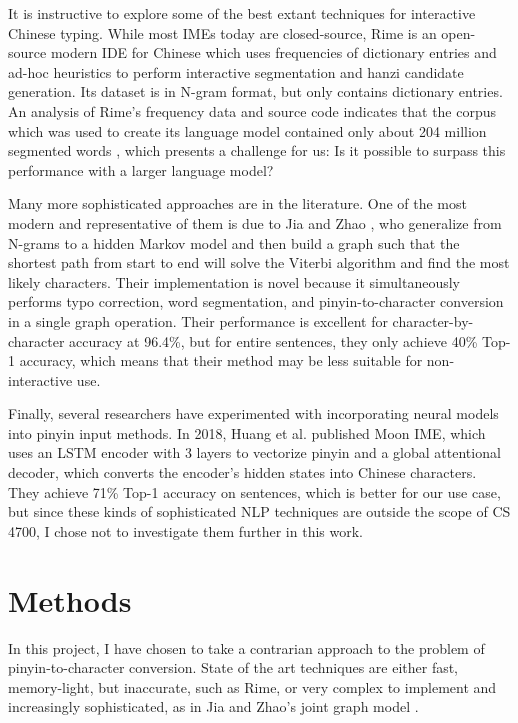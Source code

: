 \documentclass[11pt]{ctexart}
\begin{document}
It is instructive to explore some of the best extant techniques
for interactive Chinese typing.
While most IMEs today are closed-source, 
Rime \cite{rimewebsite} is an open-source modern IDE for Chinese
which uses frequencies of dictionary entries and ad-hoc 
heuristics to perform interactive segmentation and hanzi candidate generation.
Its dataset is in N-gram format, but only contains dictionary entries. An
analysis of Rime's frequency data and source code
indicates that the corpus which was
used to create its language model contained only about 204 million segmented
words \cite{rimegithub}, which presents a challenge for us: Is it possible to surpass
this performance with a larger language model?

Many more sophisticated approaches are in the literature.
One of the most modern and representative of them is due to
Jia and Zhao \cite{jointgraph}, who generalize from N-grams to a hidden Markov model 
and then build a graph such that the shortest path from start to end 
will solve the Viterbi algorithm and find the most likely characters. 
Their implementation is novel because it
simultaneously performs typo correction, word segmentation, and pinyin-to-character
conversion in a single graph operation. Their performance is excellent for 
character-by-character accuracy at 96.4\%, but for entire sentences,
they only achieve 40\% Top-1 accuracy, which means that their method
may be less suitable for non-interactive use.

Finally, several researchers have experimented with incorporating neural models into
pinyin input methods. In 2018, Huang et al. \cite{moonime} published Moon IME, 
which uses an LSTM encoder with 3 layers to vectorize pinyin and a global 
attentional decoder, which converts the encoder's hidden states into Chinese
characters. They achieve 71\% Top-1 accuracy on sentences, which is better for
our use case, but since these kinds of sophisticated NLP techniques
are outside the scope of CS 4700, I chose not to investigate them
further in this work.




\section{Methods}

In this project, I have chosen to take a contrarian approach to the problem of 
pinyin-to-character conversion. State of the art techniques are either
fast, memory-light, but inaccurate, such as Rime, or very complex to implement
and increasingly sophisticated, as in Jia and Zhao's joint graph model \cite{jointgraph}.
\end{document}
